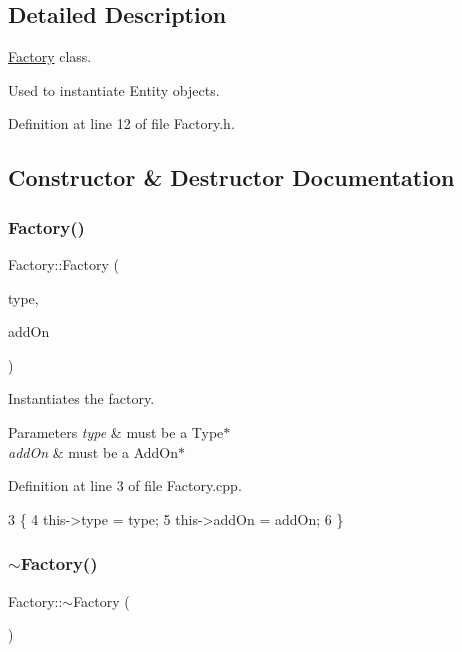 \subsection{Detailed Description}
\hyperlink{classFactory}{Factory} class. 

Used to instantiate Entity objects. 

Definition at line 12 of file Factory.\+h.



\subsection{Constructor \& Destructor Documentation}
\mbox{\label{classFactory_aca946f8877efb5b5bae700f74537d99d}} 
\subsubsection{\texorpdfstring{Factory()}{Factory()}}
{\footnotesize\ttfamily Factory\+::\+Factory (\begin{DoxyParamCaption}\item[{\hyperlink{classType}{Type} $\ast$}]{type,  }\item[{\hyperlink{classAddOn}{Add\+On} $\ast$}]{add\+On }\end{DoxyParamCaption})}



Instantiates the factory. 


\begin{DoxyParams}{Parameters}
{\em type} & must be a Type$\ast$ \\
\hline
{\em add\+On} & must be a Add\+On$\ast$ \\
\hline
\end{DoxyParams}


Definition at line 3 of file Factory.\+cpp.


\begin{DoxyCode}
3                                          \{
4     this->type = type;
5     this->addOn = addOn;
6 \}
\end{DoxyCode}
\mbox{\label{classFactory_a8f71456f48e4df402c778a44191ff40e}} 
\subsubsection{\texorpdfstring{$\sim$\+Factory()}{~Factory()}}
{\footnotesize\ttfamily Factory\+::$\sim$\+Factory (\begin{DoxyParamCaption}{ }\end{DoxyParamCaption})}



